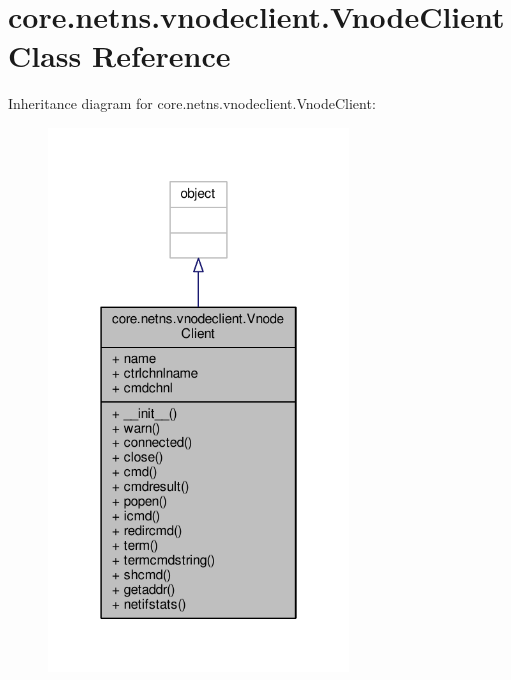 \hypertarget{classcore_1_1netns_1_1vnodeclient_1_1_vnode_client}{\section{core.\+netns.\+vnodeclient.\+Vnode\+Client Class Reference}
\label{classcore_1_1netns_1_1vnodeclient_1_1_vnode_client}
}


Inheritance diagram for core.\+netns.\+vnodeclient.\+Vnode\+Client\+:
\nopagebreak
\begin{figure}[H]
\begin{center}
\leavevmode
\includegraphics[width=226pt]{classcore_1_1netns_1_1vnodeclient_1_1_vnode_client__inherit__graph}
\end{center}
\end{figure}


